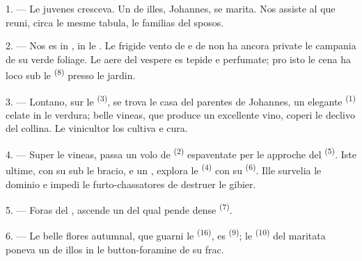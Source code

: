 
\VUsaut{4.0mm}
\VUsaut{1.6mm}
\VUsaut{3.2mm}

\VUsaut{1.6mm}
\VUsaut{2.6mm}

\VUsaut{3.0mm}

1. --- Le juvenes cresceva. Un de illes, Johannes, se marita. Nos assiste al
 que reuni, circa le mesme tabula, le familias del
sposos.

2. --- Nos es in , in le . Le frigide
vento de  e de  non ha ancora private le
campania de su verde foliage. Le aere del vespere es tepide e perfumate; pro
isto le cena ha loco sub le  \textsuperscript{(8)} presso le
jardin.

3. --- Lontano, sur le  \textsuperscript{(3)}, se trova le casa
del parentes de Johannes, un elegante  \textsuperscript{(1)}
celate in le verdura; belle vineas, que produce un excellente vino, coperi le
declivo del collina. Le vinicultor los cultiva e cura.

4. --- Super le vineas, passa un volo de  \textsuperscript{(2)}
espaventate per le approche del  \textsuperscript{(5)}.
Iste ultime, con su  sub le bracio, e un , explora le  \textsuperscript{(4)} con su
 \textsuperscript{(6)}. Ille survelia le dominio e impedi le
furto-chassatores de destruer le gibier.

5. --- Foras del , ascende un  del qual
pende dense  \textsuperscript{(7)}.

6. --- Le belle flores autumnal, que guarni le 
\textsuperscript{(16)}, es  \textsuperscript{(9)}; le
 \textsuperscript{(10)} del maritata poneva un de illos in le
button-foramine de su frac.

